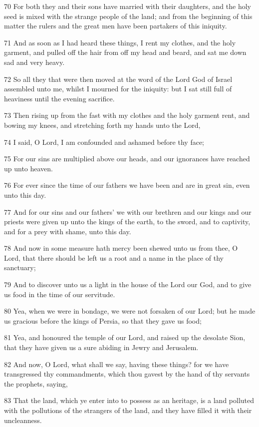 \par 70 For both they and their sons have married with their daughters, and the holy seed is mixed with the strange people of the land; and from the beginning of this matter the rulers and the great men have been partakers of this iniquity.
\par 71 And as soon as I had heard these things, I rent my clothes, and the holy garment, and pulled off the hair from off my head and beard, and sat me down sad and very heavy.
\par 72 So all they that were then moved at the word of the Lord God of Israel assembled unto me, whilst I mourned for the iniquity: but I sat still full of heaviness until the evening sacrifice.
\par 73 Then rising up from the fast with my clothes and the holy garment rent, and bowing my knees, and stretching forth my hands unto the Lord,
\par 74 I said, O Lord, I am confounded and ashamed before thy face;
\par 75 For our sins are multiplied above our heads, and our ignorances have reached up unto heaven.
\par 76 For ever since the time of our fathers we have been and are in great sin, even unto this day.
\par 77 And for our sins and our fathers' we with our brethren and our kings and our priests were given up unto the kings of the earth, to the sword, and to captivity, and for a prey with shame, unto this day.
\par 78 And now in some measure hath mercy been shewed unto us from thee, O Lord, that there should be left us a root and a name in the place of thy sanctuary;
\par 79 And to discover unto us a light in the house of the Lord our God, and to give us food in the time of our servitude.
\par 80 Yea, when we were in bondage, we were not forsaken of our Lord; but he made us gracious before the kings of Persia, so that they gave us food;
\par 81 Yea, and honoured the temple of our Lord, and raised up the desolate Sion, that they have given us a sure abiding in Jewry and Jerusalem.
\par 82 And now, O Lord, what shall we say, having these things? for we have transgressed thy commandments, which thou gavest by the hand of thy servants the prophets, saying,
\par 83 That the land, which ye enter into to possess as an heritage, is a land polluted with the pollutions of the strangers of the land, and they have filled it with their uncleanness.
